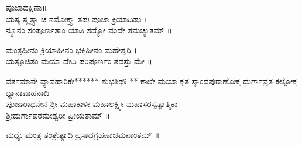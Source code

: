 ಪೂಜಾದಕ್ಷಿಣಾ॥\\
ಯಸ್ಯ ಸ್ಮೃತ್ಯಾ ಚ ನಮೋಕ್ತ್ಯಾ ತಪಃ ಪೂಜಾ ಕ್ರಿಯಾದಿಷು ।\\
ನ್ಯೂನಂ ಸಂಪೂರ್ಣತಾಂ ಯಾತಿ ಸದ್ಯೋ ವಂದೇ ತಮಚ್ಯುತಮ್ ॥

ಮಂತ್ರಹೀನಂ ಕ್ರಿಯಾಹೀನಂ ಭಕ್ತಿಹೀನಂ ಮಹೇಶ್ವರಿ ।\\
ಯತ್ಪೂಜಿತಂ ಮಯಾ ದೇವಿ ಪರಿಪೂರ್ಣಂ ತದಸ್ತು ಮೇ ॥

ವರ್ತಮಾನೇ ವ್ಯಾವಹಾರಿಕೇ****** ಶುಭತಿಥೌ ** ಕಾಲೇ 
ಮಯಾ ಕೃತ ಸ್ಕಾಂದಪುರಾಣೋಕ್ತ ದುರ್ಗಾವ್ರತ ಕಲ್ಪೋಕ್ತ ಧ್ಯಾನಾವಾಹನಾದಿ\\ 
ಪೂಜಾರಾಧನೇನ ಶ್ರೀ ಮಹಾಕಾಳೀ ಮಹಾಲಕ್ಷ್ಮೀ ಮಹಾಸರಸ್ವತ್ಯಾತ್ಮಿಕಾ\\ ಶ್ರೀದುರ್ಗಾಪರಮೇಶ್ವರೀ ಪ್ರೀಯತಾಮ್ ॥

ಮಧ್ಯೇ ಮಂತ್ರ ತಂತ್ರೇತ್ಯಾದಿ ಪ್ರಸಾದಗ್ರಹಣಾಚಮನಾಂತಮ್ ॥

